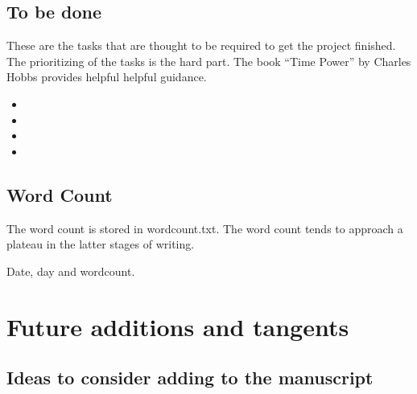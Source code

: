 \documentclass[10pt,letterpaper]{article}
\newcommand{\bi}{\begin{itemize}}
\newcommand{\ei}{\end{itemize}}
\begin{document}
\subsection{To be done}
\label{sub:to-do}

These are the tasks that are thought to be required to get the project finished.
The prioritizing of the tasks is the hard part.
The book ``Time Power'' by Charles Hobbs provides helpful helpful guidance.

\bi
\item 
\item 
\item 
\item 
\ei



\subsection{Word Count}
\label{sub:wordcount}

The word count is stored in wordcount.txt.
The word count tends to approach a plateau in the latter stages of writing.

\begin{figure}[htp!]
  \centering
\end{figure}

\begin{table}[ht]
  \centering
  \caption{Date, day and wordcount.}
  \label{tab:my_label}
\end{table}


\section{Future additions and tangents}
\label{sec:future}


\subsection{Ideas to consider adding to the manuscript}
\label{subsec:new-ideas}
\end{document}
